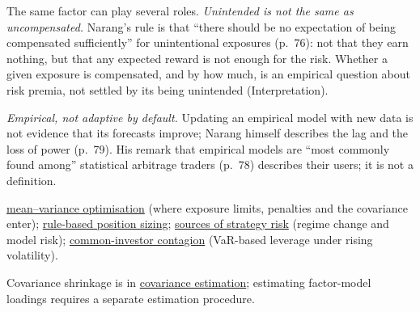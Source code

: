 \begin{qfmodel}
The same factor can play several roles. \emph{Unintended is not the same as uncompensated.} Narang's rule is that ``there should be no expectation of being compensated sufficiently'' for unintentional exposures (p.~76): not that they earn nothing, but that any expected reward is not enough for the risk. Whether a given exposure is compensated, and by how much, is an empirical question about risk premia, not settled by its being unintended (Interpretation).

\emph{Empirical, not adaptive by default.} Updating an empirical model with new data is not evidence that its forecasts improve; Narang himself describes the lag and the loss of power (p.~79). His remark that empirical models are ``most commonly found among'' statistical arbitrage traders (p.~78) describes their users; it is not a definition.

 \hyperref[mod:mean-variance-portfolio-optimisation]{mean--variance optimisation} (where exposure limits, penalties and the covariance enter); \hyperref[meth:rule-based-position-sizing]{rule-based position sizing}; \hyperref[def:quant-strategy-risk-sources]{sources of strategy risk} (regime change and model risk); \hyperref[def:common-investor-contagion]{common-investor contagion} (VaR-based leverage under rising volatility).

 Covariance shrinkage is in \hyperref[meth:portfolio-covariance-estimation]{covariance estimation}; estimating factor-model loadings requires a separate estimation procedure.

\end{qfmodel}
